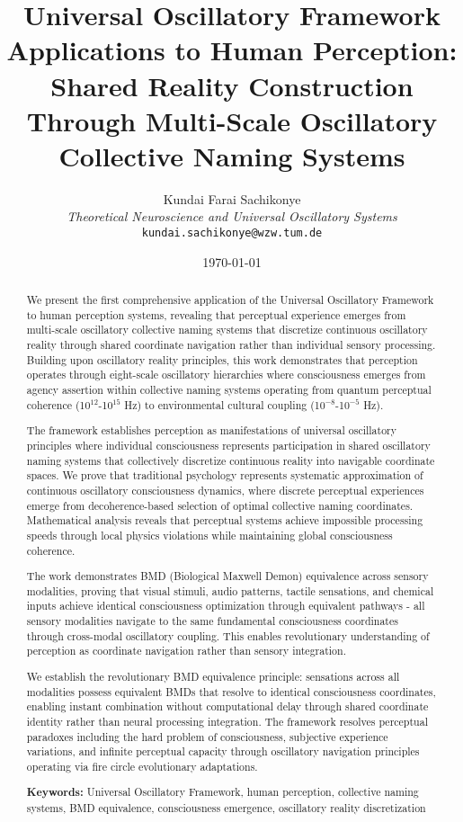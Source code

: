 \documentclass[12pt,a4paper]{article}
\title{\textbf{Universal Oscillatory Framework Applications to Human Perception: Shared Reality Construction Through Multi-Scale Oscillatory Collective Naming Systems}}
\author{
Kundai Farai Sachikonye\\
\textit{Theoretical Neuroscience and Universal Oscillatory Systems}\\
\texttt{kundai.sachikonye@wzw.tum.de}
}
\date{\today}
\begin{document}
\maketitle

\begin{abstract}
We present the first comprehensive application of the Universal Oscillatory Framework to human perception systems, revealing that perceptual experience emerges from multi-scale oscillatory collective naming systems that discretize continuous oscillatory reality through shared coordinate navigation rather than individual sensory processing. Building upon oscillatory reality principles, this work demonstrates that perception operates through eight-scale oscillatory hierarchies where consciousness emerges from agency assertion within collective naming systems operating from quantum perceptual coherence (10$^{12}$-10$^{15}$ Hz) to environmental cultural coupling (10$^{-8}$-10$^{-5}$ Hz).

The framework establishes perception as manifestations of universal oscillatory principles where individual consciousness represents participation in shared oscillatory naming systems that collectively discretize continuous reality into navigable coordinate spaces. We prove that traditional psychology represents systematic approximation of continuous oscillatory consciousness dynamics, where discrete perceptual experiences emerge from decoherence-based selection of optimal collective naming coordinates. Mathematical analysis reveals that perceptual systems achieve impossible processing speeds through local physics violations while maintaining global consciousness coherence.

The work demonstrates BMD (Biological Maxwell Demon) equivalence across sensory modalities, proving that visual stimuli, audio patterns, tactile sensations, and chemical inputs achieve identical consciousness optimization through equivalent pathways - all sensory modalities navigate to the same fundamental consciousness coordinates through cross-modal oscillatory coupling. This enables revolutionary understanding of perception as coordinate navigation rather than sensory integration.

We establish the revolutionary BMD equivalence principle: sensations across all modalities possess equivalent BMDs that resolve to identical consciousness coordinates, enabling instant combination without computational delay through shared coordinate identity rather than neural processing integration. The framework resolves perceptual paradoxes including the hard problem of consciousness, subjective experience variations, and infinite perceptual capacity through oscillatory navigation principles operating via fire circle evolutionary adaptations.

\textbf{Keywords:} Universal Oscillatory Framework, human perception, collective naming systems, BMD equivalence, consciousness emergence, oscillatory reality discretization
\end{abstract}
\end{document}
